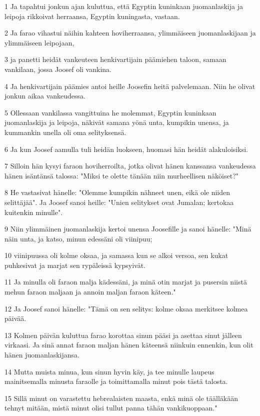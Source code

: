\par 1 Ja tapahtui jonkun ajan kuluttua, että Egyptin kuninkaan juomanlaskija ja leipoja rikkoivat herraansa, Egyptin kuningasta, vastaan.
\par 2 Ja farao vihastui näihin kahteen hoviherraansa, ylimmäiseen juomanlaskijaan ja ylimmäiseen leipojaan,
\par 3 ja panetti heidät vankeuteen henkivartijain päämiehen taloon, samaan vankilaan, jossa Joosef oli vankina.
\par 4 Ja henkivartijain päämies antoi heille Joosefin heitä palvelemaan. Niin he olivat jonkun aikaa vankeudessa.
\par 5 Ollessaan vankilassa vangittuina he molemmat, Egyptin kuninkaan juomanlaskija ja leipoja, näkivät samana yönä unta, kumpikin unensa, ja kummankin unella oli oma selityksensä.
\par 6 Ja kun Joosef aamulla tuli heidän luokseen, huomasi hän heidät alakuloisiksi.
\par 7 Silloin hän kysyi faraon hoviherroilta, jotka olivat hänen kanssansa vankeudessa hänen isäntänsä talossa: "Miksi te olette tänään niin murheellisen näköiset?"
\par 8 He vastasivat hänelle: "Olemme kumpikin nähneet unen, eikä ole niiden selittäjää". Ja Joosef sanoi heille: "Unien selitykset ovat Jumalan; kertokaa kuitenkin minulle".
\par 9 Niin ylimmäinen juomanlaskija kertoi unensa Joosefille ja sanoi hänelle: "Minä näin unta, ja katso, minun edessäni oli viinipuu;
\par 10 viinipuussa oli kolme oksaa, ja samassa kun se alkoi versoa, sen kukat puhkesivat ja marjat sen rypäleissä kypsyivät.
\par 11 Ja minulla oli faraon malja kädessäni, ja minä otin marjat ja pusersin niistä mehun faraon maljaan ja annoin maljan faraon käteen."
\par 12 Ja Joosef sanoi hänelle: "Tämä on sen selitys: kolme oksaa merkitsee kolmea päivää.
\par 13 Kolmen päivän kuluttua farao korottaa sinun pääsi ja asettaa sinut jälleen virkaasi. Ja sinä annat faraon maljan hänen käteensä niinkuin ennenkin, kun olit hänen juomanlaskijansa.
\par 14 Mutta muista minua, kun sinun hyvin käy, ja tee minulle laupeus mainitsemalla minusta faraolle ja toimittamalla minut pois tästä talosta.
\par 15 Sillä minut on varastettu hebrealaisten maasta, enkä minä ole täälläkään tehnyt mitään, mistä minut olisi tullut panna tähän vankikuoppaan."
